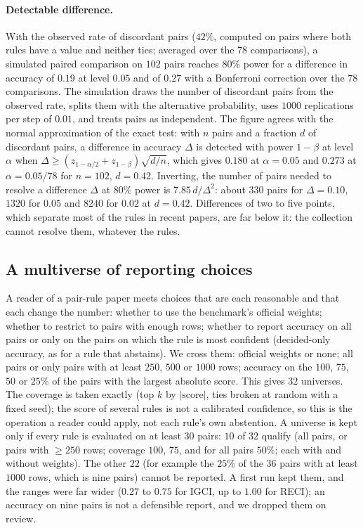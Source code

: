 \paragraph{Detectable difference.} With the observed rate of discordant pairs ($42\%$, computed on pairs where both rules have a value and neither ties; averaged over the $78$ comparisons), a simulated paired comparison on $102$ pairs reaches $80\%$ power for a difference in accuracy of $0.19$ at level $0.05$ and of $0.27$ with a Bonferroni correction over the $78$ comparisons. The simulation draws the number of discordant pairs from the observed rate, splits them with the alternative probability, uses $1000$ replications per step of $0.01$, and treats pairs as independent. The figure agrees with the normal approximation of the exact test: with $n$ pairs and a fraction $d$ of discordant pairs, a difference in accuracy $\Delta$ is detected with power $1-\beta$ at level $\alpha$ when $\Delta\ge (z_{1-\alpha/2}+z_{1-\beta})\sqrt{d/n}$, which gives $0.180$ at $\alpha=0.05$ and $0.273$ at $\alpha=0.05/78$ for $n=102$, $d=0.42$. Inverting, the number of pairs needed to resolve a difference $\Delta$ at $80\%$ power is $7.85\,d/\Delta^2$: about $330$ pairs for $\Delta=0.10$, $1320$ for $0.05$ and $8240$ for $0.02$ at $d=0.42$. Differences of two to five points, which separate most of the rules in recent papers, are far below it: the collection cannot resolve them, whatever the rules.



\subsection{A multiverse of reporting choices}\label{sec:multi}

A reader of a pair-rule paper meets choices that are each reasonable and that each change the number: whether to use the benchmark's official weights; whether to restrict to pairs with enough rows; whether to report accuracy on all pairs or only on the pairs on which the rule is most confident (decided-only accuracy, as for a rule that abstains). We cross them: official weights or none; all pairs or only pairs with at least $250$, $500$ or $1000$ rows; accuracy on the $100$, $75$, $50$ or $25\%$ of the pairs with the largest absolute score. This gives $32$ universes. The coverage is taken exactly (top $k$ by $|\mathrm{score}|$, ties broken at random with a fixed seed); the score of several rules is not a calibrated confidence, so this is the operation a reader could apply, not each rule's own abstention. A universe is kept only if every rule is evaluated on at least $30$ pairs: $10$ of $32$ qualify (all pairs, or pairs with $\ge 250$ rows; coverage $100$, $75$, and for all pairs $50\%$; each with and without weights). The other $22$ (for example the $25\%$ of the $36$ pairs with at least $1000$ rows, which is nine pairs) cannot be reported. A first run kept them, and the ranges were far wider ($0.27$ to $0.75$ for IGCI, up to $1.00$ for RECI); an accuracy on nine pairs is not a defensible report, and we dropped them on review.

